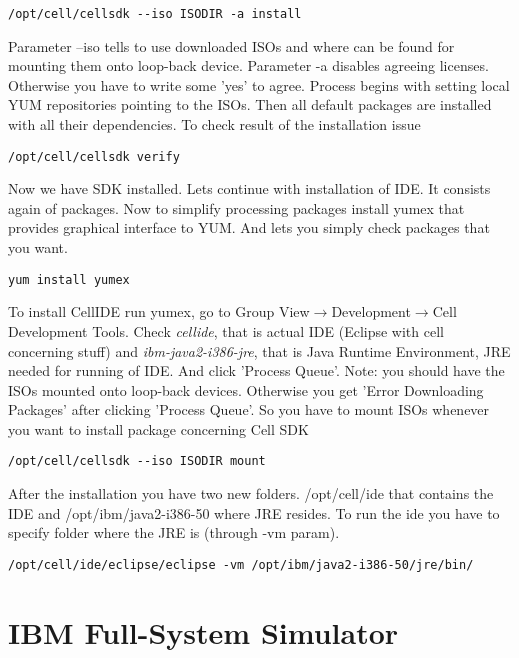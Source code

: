 \begin{verbatim}
/opt/cell/cellsdk --iso ISODIR -a install
\end{verbatim}

Parameter --iso tells to use downloaded ISOs and where can be found for mounting them onto loop-back device.
Parameter -a disables agreeing licenses. Otherwise you have to write some 'yes' to agree.
Process begins with setting local YUM repositories pointing to the ISOs.
Then all default packages are installed with all their dependencies.
To check result of the installation issue

\begin{verbatim}
/opt/cell/cellsdk verify
\end{verbatim}

Now we have SDK installed. Lets continue with installation of IDE.
It consists again of packages.
Now to simplify processing packages install yumex that provides graphical interface to YUM.
And lets you simply check packages that you want.

\begin{verbatim}
yum install yumex
\end{verbatim}

To install CellIDE run yumex, go to Group View$\rightarrow$Development$\rightarrow$Cell Development Tools.
Check \textit{cellide}, that is actual IDE (Eclipse with cell concerning stuff) and \textit{ibm-java2-i386-jre}, that is Java Runtime Environment, JRE needed for running of IDE.
And click 'Process Queue'. Note: you should have the ISOs mounted onto loop-back devices.
Otherwise you get 'Error Downloading Packages' after clicking 'Process Queue'.
So you have to mount ISOs whenever you want to install package concerning Cell SDK

\begin{verbatim}
/opt/cell/cellsdk --iso ISODIR mount
\end{verbatim}

After the installation you have two new folders.
/opt/cell/ide that contains the IDE and /opt/ibm/java2-i386-50 where JRE resides.
To run the ide you have to specify folder where the JRE is (through -vm param).

\begin{verbatim}
/opt/cell/ide/eclipse/eclipse -vm /opt/ibm/java2-i386-50/jre/bin/
\end{verbatim}

\section{IBM Full-System Simulator}

